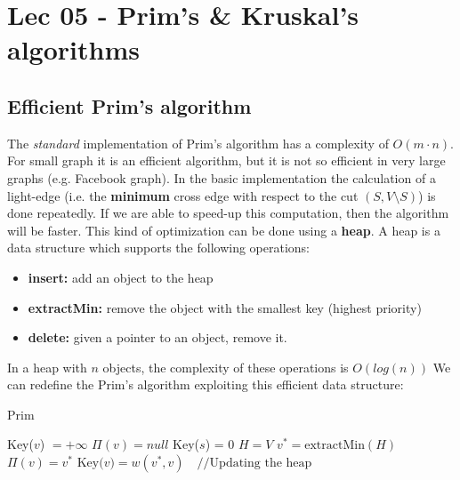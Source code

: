 \chapter{Lec 05 - Prim's \& Kruskal's algorithms}

\section{Efficient Prim's algorithm}
The \textit{standard} implementation of Prim's algorithm has a complexity of $O(m \cdot n)$. For small graph it is an efficient algorithm, but it is not so efficient in very large graphs (e.g. Facebook graph).\newline\newline
In the basic implementation the calculation of a light-edge (i.e. the \textbf{minimum} cross edge with respect to the cut $(S, V \setminus S)$) is done repeatedly. If we are able to speed-up this computation, then the algorithm will be faster. This kind of optimization can be done using a \textbf{heap}. A heap is a data structure which supports the following operations:
\begin{itemize}
    \item \textbf{insert:} add an object to the heap
    \item \textbf{extractMin:} remove the object with the smallest key (highest priority)
    \item \textbf{delete:} given a pointer to an object, remove it.
\end{itemize}
In a heap with $n$ objects, the complexity of these operations is $O(log(n))$\newline\newline
We can redefine the Prim's algorithm exploiting this efficient data structure:
\begin{algorithm}
\caption{Prim}\label{Prim}
    \begin{algorithmic}[1]
            \State Key($v$) $= + \infty$
            \State $\Pi(v) = null$
        \EndFor
        \State Key($s$) = 0
        \State $H = V$
            \State $v^{*} = \text{extractMin}(H)$
                    \State $\Pi(v) = v^{*}$
                    \State $\text{Key($v$)} = w(v^{*}, v) \quad \text{//Updating the heap}$
                \EndIf
            \EndFor
        \EndWhile
    \EndProcedure
    \end{algorithmic}
\end{algorithm}\newline\newline
